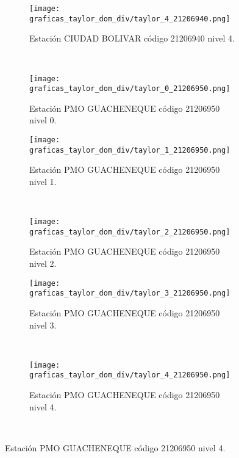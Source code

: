 \begin{figure}[H]\ContinuedFloat
\begin{subfigure}[normla]{0.4\textwidth}
\texttt{[image: graficas\_taylor\_dom\_div/taylor\_4\_21206940.png]}
\caption{Estación CIUDAD BOLIVAR  código 21206940 nivel 4.}
\end{subfigure}
~
\begin{subfigure}[normla]{0.4\textwidth}
\texttt{[image: graficas\_taylor\_dom\_div/taylor\_0\_21206950.png]}
\caption{Estación PMO GUACHENEQUE  código 21206950 nivel 0.}
\end{subfigure}

\begin{subfigure}[normla]{0.4\textwidth}
\texttt{[image: graficas\_taylor\_dom\_div/taylor\_1\_21206950.png]}
\caption{Estación PMO GUACHENEQUE  código 21206950 nivel 1.}
\end{subfigure}
~
\begin{subfigure}[normla]{0.4\textwidth}
\texttt{[image: graficas\_taylor\_dom\_div/taylor\_2\_21206950.png]}
\caption{Estación PMO GUACHENEQUE  código 21206950 nivel 2.}
\end{subfigure}

\begin{subfigure}[normla]{0.4\textwidth}
\texttt{[image: graficas\_taylor\_dom\_div/taylor\_3\_21206950.png]}
\caption{Estación PMO GUACHENEQUE  código 21206950 nivel 3.}
\end{subfigure}
~
\begin{subfigure}[normla]{0.4\textwidth}
\texttt{[image: graficas\_taylor\_dom\_div/taylor\_4\_21206950.png]}
\caption{Estación PMO GUACHENEQUE  código 21206950 nivel 4.}
\end{subfigure}
~
\end{figure}
           
